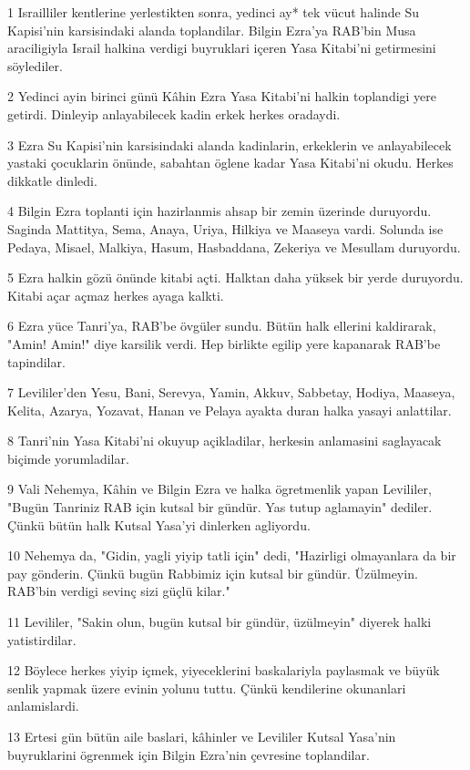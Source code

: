 \par 1 Israilliler kentlerine yerlestikten sonra, yedinci ay* tek vücut halinde Su Kapisi'nin karsisindaki alanda toplandilar. Bilgin Ezra'ya RAB'bin Musa araciligiyla Israil halkina verdigi buyruklari içeren Yasa Kitabi'ni getirmesini söylediler.
\par 2 Yedinci ayin birinci günü Kâhin Ezra Yasa Kitabi'ni halkin toplandigi yere getirdi. Dinleyip anlayabilecek kadin erkek herkes oradaydi.
\par 3 Ezra Su Kapisi'nin karsisindaki alanda kadinlarin, erkeklerin ve anlayabilecek yastaki çocuklarin önünde, sabahtan öglene kadar Yasa Kitabi'ni okudu. Herkes dikkatle dinledi.
\par 4 Bilgin Ezra toplanti için hazirlanmis ahsap bir zemin üzerinde duruyordu. Saginda Mattitya, Sema, Anaya, Uriya, Hilkiya ve Maaseya vardi. Solunda ise Pedaya, Misael, Malkiya, Hasum, Hasbaddana, Zekeriya ve Mesullam duruyordu.
\par 5 Ezra halkin gözü önünde kitabi açti. Halktan daha yüksek bir yerde duruyordu. Kitabi açar açmaz herkes ayaga kalkti.
\par 6 Ezra yüce Tanri'ya, RAB'be övgüler sundu. Bütün halk ellerini kaldirarak, "Amin! Amin!" diye karsilik verdi. Hep birlikte egilip yere kapanarak RAB'be tapindilar.
\par 7 Levililer'den Yesu, Bani, Serevya, Yamin, Akkuv, Sabbetay, Hodiya, Maaseya, Kelita, Azarya, Yozavat, Hanan ve Pelaya ayakta duran halka yasayi anlattilar.
\par 8 Tanri'nin Yasa Kitabi'ni okuyup açikladilar, herkesin anlamasini saglayacak biçimde yorumladilar.
\par 9 Vali Nehemya, Kâhin ve Bilgin Ezra ve halka ögretmenlik yapan Levililer, "Bugün Tanriniz RAB için kutsal bir gündür. Yas tutup aglamayin" dediler. Çünkü bütün halk Kutsal Yasa'yi dinlerken agliyordu.
\par 10 Nehemya da, "Gidin, yagli yiyip tatli için" dedi, "Hazirligi olmayanlara da bir pay gönderin. Çünkü bugün Rabbimiz için kutsal bir gündür. Üzülmeyin. RAB'bin verdigi sevinç sizi güçlü kilar."
\par 11 Levililer, "Sakin olun, bugün kutsal bir gündür, üzülmeyin" diyerek halki yatistirdilar.
\par 12 Böylece herkes yiyip içmek, yiyeceklerini baskalariyla paylasmak ve büyük senlik yapmak üzere evinin yolunu tuttu. Çünkü kendilerine okunanlari anlamislardi.
\par 13 Ertesi gün bütün aile baslari, kâhinler ve Levililer Kutsal Yasa'nin buyruklarini ögrenmek için Bilgin Ezra'nin çevresine toplandilar.
